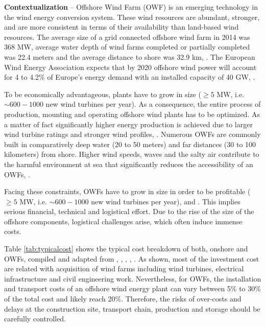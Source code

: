 \textbf{Contextualization} --
Offshore Wind Farm (OWF) is an emerging technology in the wind energy conversion system. These wind resources are abundant, stronger, and are more consistent in terms of their availability than land-based wind resources. The average size of a grid connected offshore wind farm in 2014 was 368 MW, average water depth of wind farms completed or partially completed was 22.4 meters and the average distance to shore was 32.9 km, \cite{Giorgio2015}. The European Wind Energy Association expects that by 2020 offshore wind power will account for 4 to 4.2\% of Europe's energy demand with an installed capacity of 40 GW, \cite{EWEA2011, Kaldellis2013}.

To be economically advantageous, plants have to grow in size ($\geq 5$ MW, i.e. $\sim600-1000$ new wind turbines per year). As a consequence, the entire process of production, mounting and operating offshore wind plants has to be optimized. As a matter of fact significantly higher energy production is achieved due to larger wind turbine ratings and stronger wind profiles, \cite{Sun2012298}. Numerous OWFs are commonly built in comparatively deep water (20 to 50 meters) and far distances (30 to 100 kilometers) from shore. Higher wind speeds, waves and the salty air contribute to the harmful environment at sea that significantly reduces the accessibility of an OWFs, \cite{Smit2007}.

Facing these constraints, OWFs have to grow in size in order to be profitable ($\geq 5$ MW, i.e. $\sim600-1000$ new wind turbines per year), \cite{EWEA2011} and \cite{Kaldellis2013}. This implies serious financial, technical and logistical effort. Due to the rise of the size of the offshore components, logistical challenges arise, which often induce immense costs.

Table \ref{tab:typicalcost} shows the typical cost breakdown of both, onshore and OWFs, compiled and adapted from \cite{Henderson2003}, \cite{Junginger2004}, \cite{UK10}, \cite{TCE12}, \cite{IRENA12}. As shown, most of the investment cost are related with acquisition of wind farms including wind turbines, electrical infrastructure and civil engineering work. Nevertheless, for OWFs, the installation and transport costs of an offshore wind energy plant can vary between 5\% to 30\% of the total cost and likely reach 20\%. Therefore, the risks of over-costs and delays at the construction site, transport chain, production and storage should be carefully controlled.
